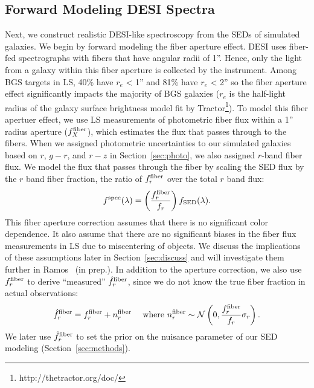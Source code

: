 \subsection{Forward Modeling DESI Spectra} \label{sec:spec}
Next, we construct realistic DESI-like spectroscopy from the SEDs of simulated
galaxies. 
We begin by forward modeling the fiber aperture effect. %
DESI uses fiber-fed spectrographs with fibers that have angular radii of 1''. 
Hence, only the light from a galaxy within this fiber aperture is collected by
the instrument.
Among BGS targets in LS, 40\% have $r_e$ < 1'' and 81\% have $r_e$ < 2'' so
the fiber aperture effect significantly impacts the majority of BGS
galaxies ($r_e$ is the half-light radius of the galaxy surface brightness
model fit by {\sc Tractor}\footnote{http://thetractor.org/doc/}).
To model this fiber apertuer effect, we use LS measurements of photometric
fiber flux within a 1'' radius aperture ($f_X^{\rm fiber}$), which estimates
the flux that passes through to the fibers.
When we assigned photometric uncertainties to our simulated galaxies based on
$r$, $g-r$, and $r-z$ in Section~\ref{sec:photo}, we also assigned $r$-band
fiber flux. 
We model the flux that passes through the fiber by scaling the SED flux by the
$r$ band fiber fraction, the ratio of $f_r^{\rm fiber}$ over the total $r$ band
flux: 
\begin{equation}
    f^{\rm spec}(\lambda) = \left(\frac{f_r^{\rm fiber}}{f_r}\right)f_{\rm SED}(\lambda).
\end{equation}
This fiber aperture correction assumes that there is no significant color
dependence. 
It also assume that there are no significant biases in the fiber flux
measurements in LS due to miscentering of objects. 
We discuss the implications of these assumptions later in
Section~\ref{sec:discuss} and will investigate them further in Ramos \etal~(in
prep.). 
In addition to the aperture correction, we also use $f_r^{\rm fiber}$ to derive
``measured'' $\hat{f}_r^{\rm fiber}$, since we do not know the true fiber
fraction in actual observations: 
\begin{equation}
    \hat{f}_r^{\rm fiber} = f_r^{\rm fiber} + n^{\rm fiber}_r \quad~{\rm
    where}~n^{\rm fiber}_r \sim \mathcal{N}\left(0, \frac{f_r^{\rm fiber}}{f_r}
    \sigma_r\right).
\end{equation}
We later use $\hat{f}_r^{\rm fiber}$ to set the prior on the nuisance parameter
of our SED modeling (Section~\ref{sec:methods}).


